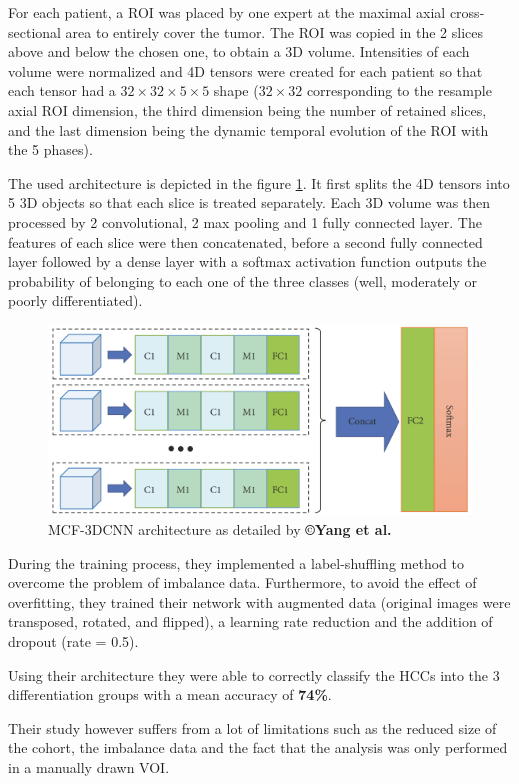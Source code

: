 For each patient, a ROI was placed by one expert at the maximal axial
cross-sectional area to entirely cover the tumor. The ROI was
copied in the 2 slices above and below the chosen one, to obtain a 3D
volume. Intensities of each volume were normalized and 4D tensors were
created for each patient so that each tensor had a $ 32\times32\times5\times5 $ shape
($ 32\times32 $ corresponding to the resample axial ROI dimension, the third
dimension being the number of retained slices, and the last dimension being the
dynamic temporal evolution of the ROI with the 5 phases).

The used architecture is depicted in the figure \ref{fig:Yang2019_Figure2_MCF-3DCNN}. It first splits the 4D
tensors into 5 3D objects so that each slice is treated separately. Each
3D volume was then processed by 2 convolutional, 2 max pooling and 1
fully connected layer. The features of each slice were then
concatenated, before a second fully connected layer followed by a dense
layer with a softmax activation function outputs the probability of
belonging to each one of the three classes (well, moderately or poorly differentiated).

\begin{figure}[th!]
\centering
\includegraphics[width=0.7\linewidth]{images/Yang2019_Fig2}
\caption{MCF-3DCNN architecture as detailed by \textbf{©Yang et al. \cite{Yang2019}}}
\label{fig:Yang2019_Figure2_MCF-3DCNN}
\end{figure}


During the training process, they implemented a label-shuffling method
to overcome the problem of imbalance data. Furthermore, to avoid the
effect of overfitting, they trained their network with augmented data
(original images were transposed, rotated, and flipped), a learning rate
reduction and the addition of dropout (rate = 0.5).

Using their architecture they were able to correctly classify the HCCs
into the 3 differentiation groups with a mean accuracy of \textbf{74\%}.


Their study however suffers from a lot of limitations such as the
reduced size of the cohort, the imbalance data and the fact that the
analysis was only performed in a manually drawn VOI.

